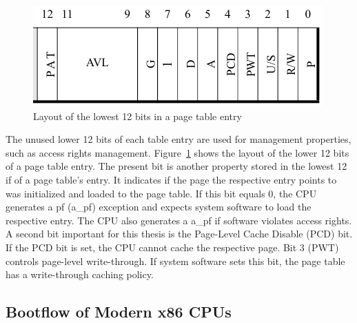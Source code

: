 \begin{figure}
    \begin{center}
        \includegraphics[width=.6\textwidth]{images/paging_rights_placeholder.png}
        \caption{Layout of the lowest 12 bits in a page table entry}
        \label{fig:state:technical:paging_rights}
    \end{center}
\end{figure}

The unused lower 12 bits of each table entry are used for management properties,
such as access rights management. Figure~\ref{fig:state:technical:paging_rights}
shows the layout of the lower 12 bits of a page table entry. The present bit is
another property stored in the lowest 12 if of a page table's entry. It
indicates if the page the respective entry points to was initialized and loaded
to the page table. If this bit equals 0, the CPU generates a \gls{pf}
(\acrshort{a_pf}) exception and expects system software to load the respective
entry. The CPU also generates a \acrshort{a_pf} if software violates access
rights. A second bit important for this thesis is the Page-Level Cache Disable
(PCD) bit. If the PCD bit is set, the CPU cannot cache the respective page. Bit
3 (PWT) controls page-level write-through. If system software sets this bit, the
page table has a write-through caching policy.

\subsection{Bootflow of Modern x86 CPUs}
\label{sec:state:technical:boot}
